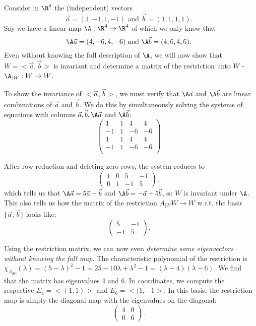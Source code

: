 \begin{example}
    Consider in $\R^4$ the (independent) vectors
    $$\vec{a}=(1,-1,1,-1) \text{ and } \vec{b}=(1,1,1,1).$$
    Say we have a linear map $\A: \R^4 \to \R^4$ of which we only know that
    $$\A\vec{a} = (4,-6,4,-6) \text{ and } \A\vec{b} = (4,6,4,6).$$
    Even without knowing the full description of $\A$, we will now show that $W = <\vec{a},\vec{b}>$ is
    invariant and determine a matrix of the restriction unto $W$ - $\A_{|W}:W \to W$.

    To show the invariance of $<\vec{a}, \vec{b}>$, we must verify that $\A\vec{a}$ and $\A\vec{b}$ are linear combinations of $\vec{a}$ and $\vec{b}$.
    We do this by simultaneously solving the systems of equations with columns $\vec{a}, \vec{b}, \A\vec{a}$ and $\A\vec{b}$:
    $$\left(\begin{array}{cc|cc}
        1 & 1 & 4 & 4 \\
        -1 & 1 & -6 & -6 \\
        1 & 1 & 4 & 4 \\
        -1 & 1 & -6 & -6 \\
    \end{array}\right)$$

    After row reduction and deleting zero rows, the system reduces to
    $$\left( \begin{array}{cc|cc}
        1 & 0 & 5 & -1 \\
    0 & 1 & -1 & 5\end{array} \right),$$
    which tells us that $\A\vec{a} = 5\vec{a} - \vec{b}$ and $\A\vec{b} = -\vec{a} + 5\vec{b}$, so $W$ is invariant under $\A$.
    This also tells us how the matrix of the restriction $A_{|W}W \to W$ w.r.t. the basis $\{\vec{a}, \vec{b}\}$ looks like:
    $$\begin{pmatrix} 5 & -1 \\ -1 & 5 \end{pmatrix}.$$

    Using the restriction matrix, we can now even \emph{determine some eigenvectors without knowing the full map}.
    The characteristic polynomial of the restriction is $\chi_{A_{|W}}(\lambda) = (5-\lambda)^2 - 1 = 25-10\lambda+\lambda^2-1 = (\lambda-4)(\lambda-6)$.
    We find that the matrix has eigenvalues $4$ and $6$. In coordinates, we compute the respective $E_4 = <(1,1)>$ and $E_6 = <(1,-1>$.
    In this basis, the restriction map is simply the diagonal map with the eigenvalues on the diagonal:
    $$\begin{pmatrix} 4 & 0 \\ 0 & 6 \end{pmatrix}.$$


\end{example}
